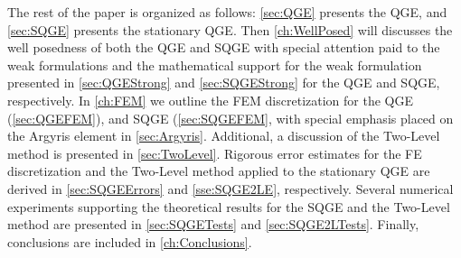 The rest of the paper is organized as follows: \autoref{sec:QGE} presents the
QGE, and \autoref{sec:SQGE} presents the stationary QGE. Then
\autoref{ch:WellPosed} will discusses the well posedness of both the QGE and
SQGE with special attention paid to the weak formulations and the mathematical
support for the weak formulation presented in \autoref{sec:QGEStrong} and
\autoref{sec:SQGEStrong} for the QGE and SQGE, respectively. In \autoref{ch:FEM}
we outline the FEM discretization for the QGE (\autoref{sec:QGEFEM}), and SQGE
(\autoref{sec:SQGEFEM}, with special emphasis placed on the Argyris element in
\autoref{sec:Argyris}. Additional, a discussion of the Two-Level method is
presented in \autoref{sec:TwoLevel}. Rigorous error estimates for the FE
discretization and the Two-Level method applied to the stationary QGE are
derived in \autoref{sec:SQGEErrors} and \autoref{sse:SQGE2LE}, respectively.
Several numerical experiments supporting the theoretical results for the SQGE
and the Two-Level method are presented in \autoref{sec:SQGETests} and
\autoref{sec:SQGE2LTests}. Finally, conclusions are included in
\autoref{ch:Conclusions}.



